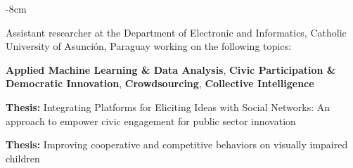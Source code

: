 \documentclass[10pt,a4paper]{altacv}
\begin{document}
\tagline{}

\begin{adjustwidth}{}{-8cm}
\makecvheader
\end{adjustwidth}


Assistant researcher at the Department of Electronic and Informatics, Catholic University of Asunci\'on, Paraguay working on the following topics: \\

\begin{center}
\textbf{Applied Machine Learning \& Data Analysis}, \textbf{Civic Participation \& Democratic Innovation}, \textbf{Crowdsourcing}, \textbf{Collective Intelligence}
\end{center}


\textbf{Thesis:} Integrating Platforms for Eliciting Ideas with Social Networks: An approach to empower civic engagement for public sector innovation

\divider

\textbf{Thesis:} Improving cooperative and competitive behaviors on visually impaired children
\end{document}
